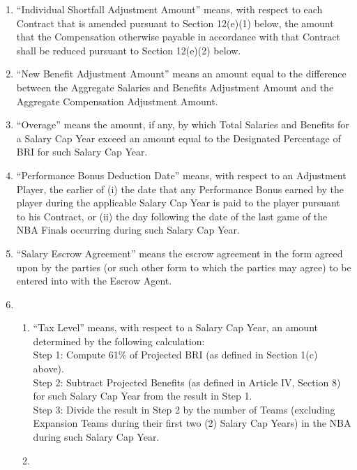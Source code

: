 \documentclass[
]{book}
\providecommand{\tightlist}{%
  \setlength{\itemsep}{0pt}\setlength{\parskip}{0pt}}
\begin{document}
\begin{enumerate}
\begin{enumerate}
  \item
    ``Individual Shortfall Adjustment Amount'' means, with respect to each Contract that is amended pursuant to Section 12(e)(1) below, the amount that the Compensation otherwise payable in accordance with that Contract shall be reduced pursuant to Section 12(e)(2) below.
  \item
    ``New Benefit Adjustment Amount'' means an amount equal to the difference between the Aggregate Salaries and Benefits Adjustment Amount and the Aggregate Compensation Adjustment Amount.
  \item
    ``Overage'' means the amount, if any, by which Total Salaries and Benefits for a Salary Cap Year exceed an amount equal to the Designated Percentage of BRI for such Salary Cap Year.
  \item
    ``Performance Bonus Deduction Date'' means, with respect to an Adjustment Player, the earlier of (i) the date that any Performance Bonus earned by the player during the applicable Salary Cap Year is paid to the player pursuant to his Contract, or (ii) the day following the date of the last game of the NBA Finals occurring during such Salary Cap Year.
  \item
    ``Salary Escrow Agreement'' means the escrow agreement in the form agreed upon by the parties (or such other form to which the parties may agree) to be entered into with the Escrow Agent.
  \item
    \begin{enumerate}
    \def\labelenumiii{(\roman{enumiii})}
    \tightlist
    \item
      ``Tax Level'' means, with respect to a Salary Cap Year, an amount determined by the following calculation:\\
      Step 1: Compute 61\% of Projected BRI (as defined in Section 1(c) above).\\
      Step 2: Subtract Projected Benefits (as defined in Article IV, Section 8) for such Salary Cap Year from the result in Step 1.\\
      Step 3: Divide the result in Step 2 by the number of Teams (excluding Expansion Teams during their first two (2) Salary Cap Years) in the NBA during such Salary Cap Year.
    \item

\end{enumerate}
\end{enumerate}
\end{enumerate}
\end{document}
